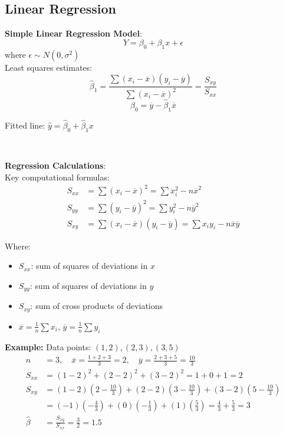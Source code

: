 \documentclass{article}
\newenvironment{cheatformula}[1][Title]{
    \begin{minipage}{\linewidth}
    \textbf{#1}:\\
}{
    \end{minipage}\\[2ex]
}
\begin{document}
\begin{multicols*}{2}
\section{Linear Regression}

\begin{cheatformula}[Simple Linear Regression Model]
    $$Y = \beta_0 + \beta_1 x + \epsilon$$
    where $\epsilon \sim N(0, \sigma^2)$\\
    
    Least squares estimates:
    $$\hat{\beta}_1 = \frac{\sum(x_i - \overline{x})(y_i - \overline{y})}{\sum(x_i - \overline{x})^2} = \frac{S_{xy}}{S_{xx}}$$
    $$\hat{\beta}_0 = \overline{y} - \hat{\beta}_1\overline{x}$$
    
    Fitted line: $\hat{y} = \hat{\beta}_0 + \hat{\beta}_1 x$
\end{cheatformula}

\begin{cheatformula}[Regression Calculations]
    Key computational formulas:
    \begin{align*}
        S_{xx} &= \sum(x_i - \overline{x})^2 = \sum x_i^2 - n\overline{x}^2\\
        S_{yy} &= \sum(y_i - \overline{y})^2 = \sum y_i^2 - n\overline{y}^2\\
        S_{xy} &= \sum(x_i - \overline{x})(y_i - \overline{y}) = \sum x_i y_i - n\overline{x}\overline{y}
    \end{align*}
    
    Where:
    \begin{itemize}
        \item $S_{xx}$: sum of squares of deviations in $x$
        \item $S_{yy}$: sum of squares of deviations in $y$
        \item $S_{xy}$: sum of cross products of deviations
        \item $\overline{x} = \frac{1}{n}\sum x_i$, $\overline{y} = \frac{1}{n}\sum y_i$
    \end{itemize}
    
    \textbf{Example:} Data points: $(1,2), (2,3), (3,5)$
    \begin{align*}
        n &= 3, \quad \overline{x} = \frac{1+2+3}{3} = 2, \quad \overline{y} = \frac{2+3+5}{3} = \frac{10}{3}\\
        S_{xx} &= (1-2)^2 + (2-2)^2 + (3-2)^2 = 1 + 0 + 1 = 2\\
        S_{xy} &= (1-2)(2-\frac{10}{3}) + (2-2)(3-\frac{10}{3}) + (3-2)(5-\frac{10}{3})\\
        &= (-1)(-\frac{4}{3}) + (0)(-\frac{1}{3}) + (1)(\frac{5}{3}) = \frac{4}{3} + \frac{5}{3} = 3\\
        \hat{\beta} &= \frac{S_{xy}}{S_{xx}} = \frac{3}{2} = 1.5
    \end{align*}
\end{cheatformula}


\end{multicols*}
\end{document}
